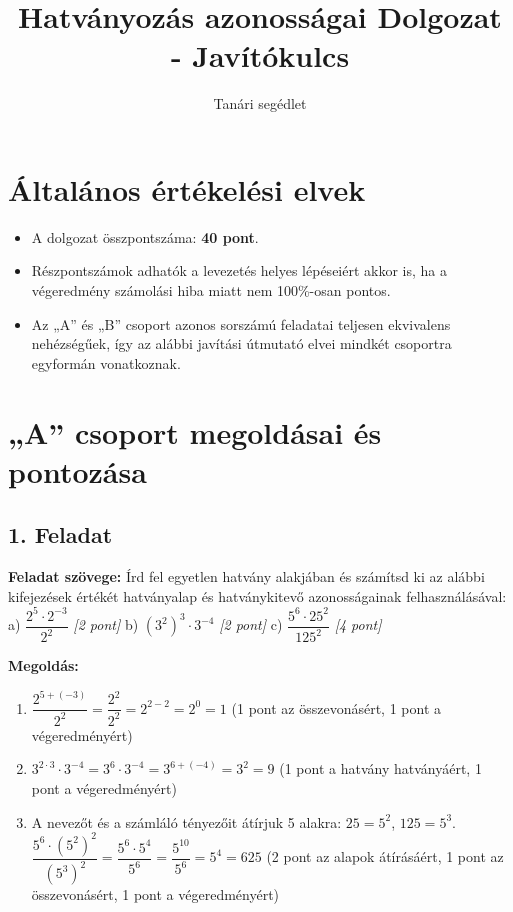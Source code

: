 \documentclass[11pt,a4paper]{article}
\title{Hatványozás azonosságai Dolgozat - Javítókulcs}
\author{Tanári segédlet}
\date{}
\begin{document}
\maketitle

\section*{Általános értékelési elvek}
\begin{itemize}
    \item A dolgozat összpontszáma: \textbf{40 pont}.
    \item Részpontszámok adhatók a levezetés helyes lépéseiért akkor is, ha a végeredmény számolási hiba miatt nem 100\%-osan pontos.
    \item Az „A” és „B” csoport azonos sorszámú feladatai teljesen ekvivalens nehézségűek, így az alábbi javítási útmutató elvei mindkét csoportra egyformán vonatkoznak.
\end{itemize}

\section*{„A” csoport megoldásai és pontozása}

\subsection*{1. Feladat}
\textbf{Feladat szövege:} Írd fel egyetlen hatvány alakjában és számítsd ki az alábbi kifejezések értékét hatványalap és hatványkitevő azonosságainak felhasználásával:
a) $\dfrac{2^5 \cdot 2^{-3}}{2^2}$ \hfill \textit{[2 pont]}
b) $(3^2)^3 \cdot 3^{-4}$ \hfill \textit{[2 pont]}
c) $\dfrac{5^6 \cdot 25^2}{125^2}$ \hfill \textit{[4 pont]}

\textbf{Megoldás:}
\begin{enumerate}
    \item[a)] $\dfrac{2^{5+(-3)}}{2^2} = \dfrac{2^2}{2^2} = 2^{2-2} = 2^0 = 1$ \hfill (1 pont az összevonásért, 1 pont a végeredményért)
    \item[b)] $3^{2 \cdot 3} \cdot 3^{-4} = 3^6 \cdot 3^{-4} = 3^{6+(-4)} = 3^2 = 9$ \hfill (1 pont a hatvány hatványáért, 1 pont a végeredményért)
    \item[c)] A nevezőt és a számláló tényezőit átírjuk 5 alakra: $25 = 5^2$, $125 = 5^3$. 
    $\dfrac{5^6 \cdot (5^2)^2}{(5^3)^2} = \dfrac{5^6 \cdot 5^4}{5^6} = \dfrac{5^{10}}{5^6} = 5^4 = 625$ \hfill (2 pont az alapok átírásáért, 1 pont az összevonásért, 1 pont a végeredményért)
\end{enumerate}
\end{document}

